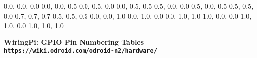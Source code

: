\documentclass[11pt,a4paper]{article}
\begin{document}
\begin{sffamily}
\definecolor{rtb-black}{rgb}  {0.0, 0.0, 0.0}
\definecolor{rtb-navy}{rgb}   {0.0, 0.0, 0.5}
\definecolor{rtb-green}{rgb}  {0.0, 0.5, 0.0}
\definecolor{rtb-teal}{rgb}   {0.0, 0.5, 0.5}
\definecolor{rtb-maroon}{rgb} {0.5, 0.0, 0.0}
\definecolor{rtb-purple}{rgb} {0.5, 0.0, 0.5}
\definecolor{rtb-olive}{rgb}  {0.5, 0.5, 0.0}
\definecolor{rtb-silver}{rgb} {0.7, 0.7, 0.7}
\definecolor{rtb-grey}{rgb}   {0.5, 0.5, 0.5}
\definecolor{rtb-blue}{rgb}   {0.0, 0.0, 1.0}
\definecolor{rtb-lime}{rgb}   {0.0, 1.0, 0.0}
\definecolor{rtb-aqua}{rgb}   {0.0, 1.0, 1.0}
\definecolor{rtb-red}{rgb}    {1.0, 0.0, 0.0}
\definecolor{rtb-yellow}{rgb} {1.0, 1.0, 0.0}
\definecolor{rtb-white}{rgb}  {1.0, 1.0, 1.0}

\begin{center}
\bfseries{WiringPi: GPIO Pin Numbering Tables}\\
\tt{https://wiki.odroid.com/odroid-n2/hardware/}
\end{center}


\end{sffamily}
\end{document}
